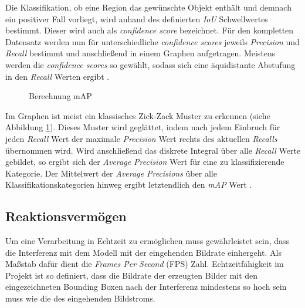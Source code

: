 Die Klassifikation, ob eine Region das gewünschte Objekt enthält und demnach ein positiver Fall vorliegt, wird anhand des definierten \textit{IoU} Schwellwertes bestimmt. Dieser wird auch als \textit{confidence score} bezeichnet. Für den kompletten Datensatz werden nun für unterschiedliche \textit{confidence scores} jeweils \textit{Precision} und \textit{Recall} bestimmt und anschließend in einem Graphen aufgetragen. Meistens werden die \textit{confidence scores} so gewählt, sodass sich eine äquidistante Abstufung in den \textit{Recall} Werten ergibt \cite{TarangShah.20180127}. 

\begin{figure}[ht]
	\caption[Berechnung mAP]{Berechnung mAP \cite{JonathanHui.20180307}} 
	\label{map}
\end{figure} 

Im Graphen ist meist ein klassisches \glqq Zick-Zack\grqq{} Muster zu erkennen (siehe Abbildung \ref{map}). Dieses Muster wird geglättet, indem nach jedem Einbruch für jeden \textit{Recall} Wert der maximale \textit{Precision} Wert rechts des aktuellen \textit{Recalls} übernommen wird. Wird anschließend das diskrete Integral über alle \textit{Recall} Werte gebildet, so ergibt sich der \textit{Average Precision} Wert für eine zu klassifizierende Kategorie. Der Mittelwert der  \textit{Average Precisions} über alle Klassifikationskategorien hinweg ergibt letztendlich den \textit{mAP} Wert \cite{JonathanHui.20180307}. 

\subsection*{Reaktionsvermögen}

Um eine Verarbeitung in Echtzeit zu ermöglichen muss gewährleistet sein, dass die Interferenz mit dem Modell mit der eingehenden Bildrate einhergeht. Als Maßstab dafür dient die \textit{Frames Per Second} (FPS) Zahl. Echtzeitfähigkeit im Projekt ist so definiert, dass die Bildrate der erzeugten Bilder mit den eingezeichneten Bounding Boxen nach der Interferenz mindestens so hoch sein muss wie die des eingehenden Bildstroms. 


